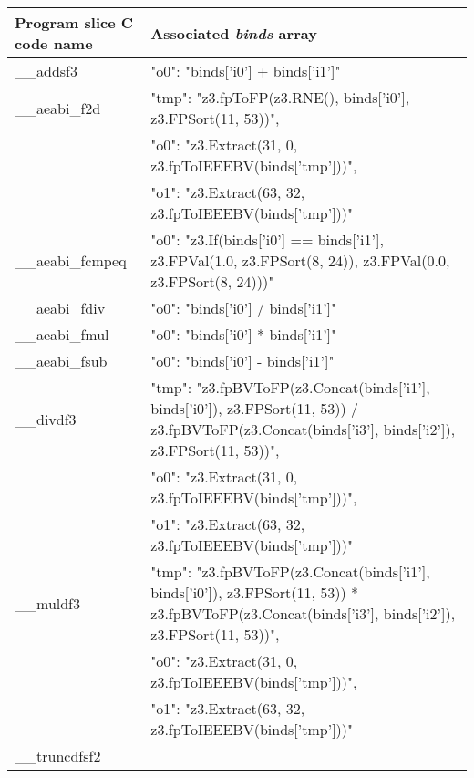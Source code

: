 \begin{tabular}{|l|p{11cm}|}
	\hline
	\textbf{Program slice C code name} & \textbf{Associated \emph{binds} array} \\ \hline
	\hline
\_\_addsf3       & 

"o0": "binds['i0'] + binds['i1']"
 \\ \hline
\_\_aeabi\_f2d    & 

"tmp": "z3.fpToFP(z3.RNE(), binds['i0'], z3.FPSort(11, 53))",
 \\
                      & 

"o0": "z3.Extract(31, 0, z3.fpToIEEEBV(binds['tmp']))",
 \\
                      & 

"o1": "z3.Extract(63, 32, z3.fpToIEEEBV(binds['tmp']))"
 \\ \hline
\_\_aeabi\_fcmpeq & 

"o0": "z3.If(binds['i0'] == binds['i1'], z3.FPVal(1.0, z3.FPSort(8, 24)), z3.FPVal(0.0, z3.FPSort(8, 24)))"
 \\ \hline
\_\_aeabi\_fdiv & 

"o0": "binds['i0'] / binds['i1']"
 \\ \hline
\_\_aeabi\_fmul & 

"o0": "binds['i0'] * binds['i1']"
 \\ \hline
\_\_aeabi\_fsub & 

"o0": "binds['i0'] - binds['i1']"
 \\ \hline
\_\_divdf3 & 

"tmp": "z3.fpBVToFP(z3.Concat(binds['i1'], binds['i0']), z3.FPSort(11, 53)) / z3.fpBVToFP(z3.Concat(binds['i3'], binds['i2']), z3.FPSort(11, 53))",
 \\
                      & 

"o0": "z3.Extract(31, 0, z3.fpToIEEEBV(binds['tmp']))",
 \\
                      & 

"o1": "z3.Extract(63, 32, z3.fpToIEEEBV(binds['tmp']))"
 \\ \hline
\_\_muldf3 & 

"tmp": "z3.fpBVToFP(z3.Concat(binds['i1'], binds['i0']), z3.FPSort(11, 53)) * z3.fpBVToFP(z3.Concat(binds['i3'], binds['i2']), z3.FPSort(11, 53))",
 \\
                      & 

"o0": "z3.Extract(31, 0, z3.fpToIEEEBV(binds['tmp']))",
 \\
                      & 

"o1": "z3.Extract(63, 32, z3.fpToIEEEBV(binds['tmp']))"
 \\ \hline
\_\_truncdfsf2 & 


\end{tabular}
